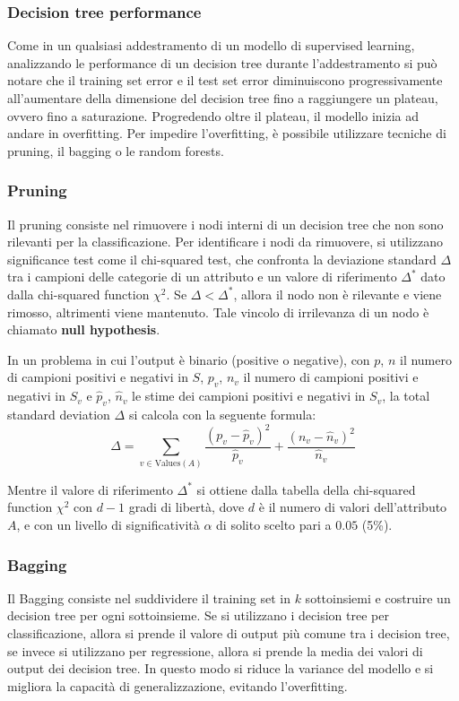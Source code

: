 \subsubsection*{Decision tree performance}
Come in un qualsiasi addestramento di un modello di supervised learning, analizzando le performance di un decision tree durante
l'addestramento si può notare che il training set error e il test set error diminuiscono progressivamente all'aumentare della
dimensione del decision tree fino a raggiungere un plateau, ovvero fino a saturazione. Progredendo oltre il plateau, il modello
inizia ad andare in overfitting. Per impedire l'overfitting, è possibile utilizzare tecniche di pruning, il bagging o le random
forests.

\subsubsection*{Pruning}
Il pruning consiste nel rimuovere i nodi interni di un decision tree che non sono rilevanti per la classificazione. Per
identificare i nodi da rimuovere, si utilizzano significance test come il chi-squared test, che confronta la deviazione
standard \(\Delta\) tra i campioni delle categorie di un attributo e un valore di riferimento \(\Delta^*\) dato dalla
chi-squared function \(\chi^2\). Se \(\Delta < \Delta^*\), allora il nodo non è rilevante e viene rimosso, altrimenti
viene mantenuto. Tale vincolo di irrilevanza di un nodo è chiamato \textbf{null hypothesis}.

In un problema in cui l'output è binario (positive o negative), con \(p\), \(n\) il numero di campioni positivi e negativi in
\(S\), \(p_v\), \(n_v\) il numero di campioni positivi e negativi in \(S_v\) e \(\hat{p}_v\), \(\hat{n}_v\) le stime dei campioni
positivi e negativi in \(S_v\), la total standard deviation \(\Delta\) si calcola con la seguente formula:
\[\Delta = \sum_{v \in \text{Values}(A)} \frac{(p_v - \hat{p}_v)^2}{\hat{p}_v} + \frac{(n_v - \hat{n}_v)^2}{\hat{n}_v}\]

Mentre il valore di riferimento \(\Delta^*\) si ottiene dalla tabella della chi-squared function \(\chi^2\) con \(d-1\) gradi
di libertà, dove \(d\) è il numero di valori dell'attributo \(A\), e con un livello di significatività \(\alpha\) di solito
scelto pari a \(0.05\) (5\%).

\subsubsection*{Bagging}
Il Bagging consiste nel suddividere il training set in \(k\) sottoinsiemi e costruire un decision tree per ogni sottoinsieme.
Se si utilizzano i decision tree per classificazione, allora si prende il valore di output più comune tra i decision tree,
se invece si utilizzano per regressione, allora si prende la media dei valori di output dei decision tree. In questo modo
si riduce la variance del modello e si migliora la capacità di generalizzazione, evitando l'overfitting.

